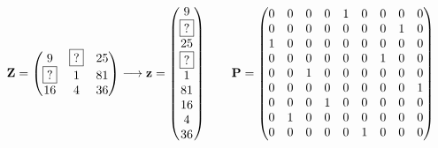 \begin{figure}[H]
	\[
	\mathbf{Z} = \left(
		\begin{matrix}
			9 & \boxed{?} & 25\\
			\boxed{?} &  1 & 81\\
			16 &  4 & 36\\
		\end{matrix}
	\right)
	\longrightarrow
	\mathbf{z} = \left(
		\begin{matrix}
			9 \\ \boxed{?} \\ 25 \\ \boxed{?} \\ 1 \\ 81 \\ 16 \\ 4 \\ 36\\
		\end{matrix}
	\right)
	\qquad
	\mathbf{P} = \left(
		\begin{matrix}
			0&0&0&0&1&0&0&0&0\\
			0&0&0&0&0&0&0&1&0\\
			1&0&0&0&0&0&0&0&0\\
			0&0&0&0&0&0&1&0&0\\
			0&0&1&0&0&0&0&0&0\\
			0&0&0&0&0&0&0&0&1\\
			0&0&0&1&0&0&0&0&0\\
			0&1&0&0&0&0&0&0&0\\
			0&0&0&0&0&1&0&0&0\\
		\end{matrix}
	\right)
	\]
	

\end{figure}

